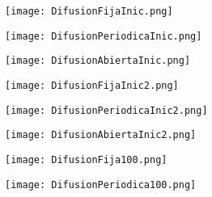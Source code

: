 \documentclass[12pts]{article}
\begin{document}
\begin{figure}[h]
\begin{center}
\texttt{[image: DifusionFijaInic.png]}
\end{center}

\end{figure}


\begin{figure}[h]
\begin{center}
\texttt{[image: DifusionPeriodicaInic.png]}
\end{center}

\end{figure}
\begin{figure}[h]
\begin{center}
\texttt{[image: DifusionAbiertaInic.png]}
\end{center}

\end{figure}

\begin{figure}[h]
\begin{center}
\texttt{[image: DifusionFijaInic2.png]}
\end{center}

\end{figure}

\begin{figure}[h]
\begin{center}
\texttt{[image: DifusionPeriodicaInic2.png]}
\end{center}

\end{figure}

\begin{figure}[h]
\begin{center}
\texttt{[image: DifusionAbiertaInic2.png]}
\end{center}

\end{figure}

\begin{figure}[h]
\begin{center}
\texttt{[image: DifusionFija100.png]}
\end{center}

\end{figure}

\begin{figure}[h]
\begin{center}
\texttt{[image: DifusionPeriodica100.png]}
\end{center}

\end{figure}
\end{document}
